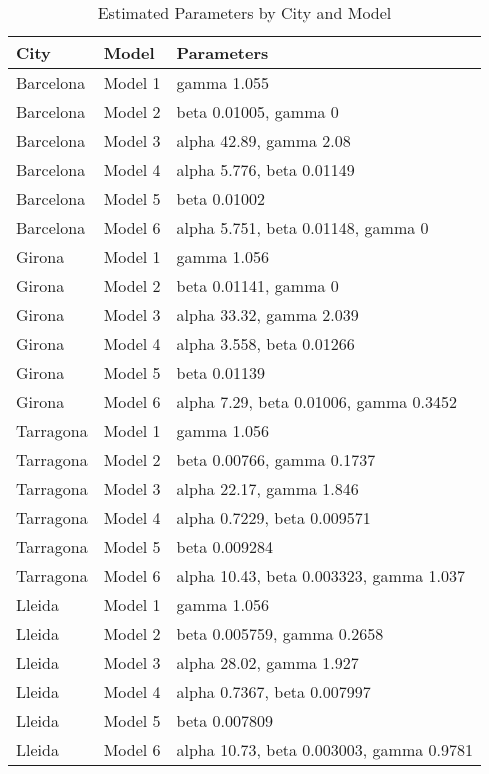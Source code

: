 \begin{table}[ht]
\centering
\begin{tabular}{lll}
  \hline
City & Model & Parameters \\ 
  \hline
Barcelona & Model 1 & gamma 1.055 \\ 
  Barcelona & Model 2 & beta 0.01005, gamma 0 \\ 
  Barcelona & Model 3 & alpha 42.89, gamma 2.08 \\ 
  Barcelona & Model 4 & alpha 5.776, beta 0.01149 \\ 
  Barcelona & Model 5 & beta 0.01002 \\ 
  Barcelona & Model 6 & alpha 5.751, beta 0.01148, gamma 0 \\ 
  Girona & Model 1 & gamma 1.056 \\ 
  Girona & Model 2 & beta 0.01141, gamma 0 \\ 
  Girona & Model 3 & alpha 33.32, gamma 2.039 \\ 
  Girona & Model 4 & alpha 3.558, beta 0.01266 \\ 
  Girona & Model 5 & beta 0.01139 \\ 
  Girona & Model 6 & alpha 7.29, beta 0.01006, gamma 0.3452 \\ 
  Tarragona & Model 1 & gamma 1.056 \\ 
  Tarragona & Model 2 & beta 0.00766, gamma 0.1737 \\ 
  Tarragona & Model 3 & alpha 22.17, gamma 1.846 \\ 
  Tarragona & Model 4 & alpha 0.7229, beta 0.009571 \\ 
  Tarragona & Model 5 & beta 0.009284 \\ 
  Tarragona & Model 6 & alpha 10.43, beta 0.003323, gamma 1.037 \\ 
  Lleida & Model 1 & gamma 1.056 \\ 
  Lleida & Model 2 & beta 0.005759, gamma 0.2658 \\ 
  Lleida & Model 3 & alpha 28.02, gamma 1.927 \\ 
  Lleida & Model 4 & alpha 0.7367, beta 0.007997 \\ 
  Lleida & Model 5 & beta 0.007809 \\ 
  Lleida & Model 6 & alpha 10.73, beta 0.003003, gamma 0.9781 \\ 
   \hline
\end{tabular}
\caption{Estimated Parameters by City and Model} 
\end{table}
